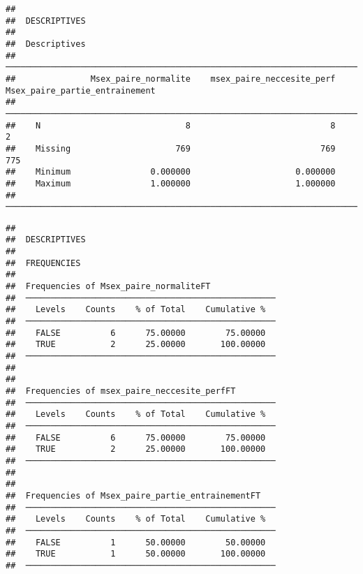 \documentclass[
]{article}
\begin{document}
\begin{verbatim}
## 
##  DESCRIPTIVES
## 
##  Descriptives                                                                                       
##  ────────────────────────────────────────────────────────────────────────────────────────────────── 
##               Msex_paire_normalite    msex_paire_neccesite_perf    Msex_paire_partie_entrainement   
##  ────────────────────────────────────────────────────────────────────────────────────────────────── 
##    N                             8                            8                                 2   
##    Missing                     769                          769                               775   
##    Minimum                0.000000                     0.000000                                     
##    Maximum                1.000000                     1.000000                                     
##  ──────────────────────────────────────────────────────────────────────────────────────────────────
\end{verbatim}

\begin{verbatim}
## 
##  DESCRIPTIVES
## 
##  FREQUENCIES
## 
##  Frequencies of Msex_paire_normaliteFT              
##  ────────────────────────────────────────────────── 
##    Levels    Counts    % of Total    Cumulative %   
##  ────────────────────────────────────────────────── 
##    FALSE          6      75.00000        75.00000   
##    TRUE           2      25.00000       100.00000   
##  ────────────────────────────────────────────────── 
## 
## 
##  Frequencies of msex_paire_neccesite_perfFT         
##  ────────────────────────────────────────────────── 
##    Levels    Counts    % of Total    Cumulative %   
##  ────────────────────────────────────────────────── 
##    FALSE          6      75.00000        75.00000   
##    TRUE           2      25.00000       100.00000   
##  ────────────────────────────────────────────────── 
## 
## 
##  Frequencies of Msex_paire_partie_entrainementFT    
##  ────────────────────────────────────────────────── 
##    Levels    Counts    % of Total    Cumulative %   
##  ────────────────────────────────────────────────── 
##    FALSE          1      50.00000        50.00000   
##    TRUE           1      50.00000       100.00000   
##  ──────────────────────────────────────────────────
\end{verbatim}
\end{document}
